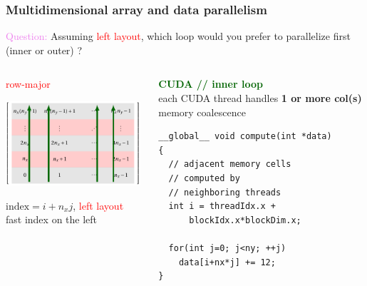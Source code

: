 \begin{frame}[fragile=singleslide]
  \frametitle{Multidimensional array and data parallelism}

  \begin{block}{}
    {\large \textcolor{violet}{Question:}
    Assuming \textcolor{red}{left layout}, which loop would you prefer to parallelize first (inner or outer) ?}    
  \end{block}
  
  \begin{columns}
    \begin{column}{0.48\textwidth}
      \begin{center}
        \textcolor{red}{\large row-major}
        
        \includegraphics[width=5cm]{images/tikz/row-major-cuda}

        $\text{index} = i + n_x j$, \textcolor{red}{left layout}\\
        fast index on the left
      \end{center}
    \end{column}
    \begin{column}{0.48\textwidth}
      \begin{center}
        \textcolor{darkgreen}{\bf CUDA // inner loop}\\
        each CUDA thread handles {\bf1 or more col(s)}\\
        memory coalescence
      \end{center}
      {\small
        \begin{verbatim}
__global__ void compute(int *data)
{
  // adjacent memory cells
  // computed by
  // neighboring threads
  int i = threadIdx.x +
      blockIdx.x*blockDim.x;
  
  for(int j=0; j<ny; ++j)
    data[i+nx*j] += 12;
}
\end{verbatim}
}
    \end{column}
    \hfill
  \end{columns}
\end{frame}

